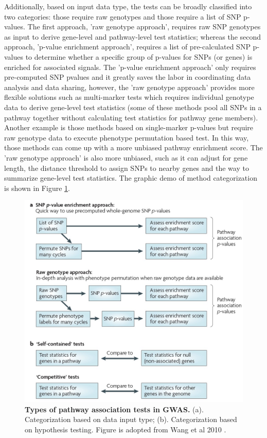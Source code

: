 \documentclass[12pt]{article}
\begin{document}
Additionally, based on input data type, the tests can be broadly classified into two categories: those require raw genotypes and those require a list of SNP p-values. The first approach, 'raw genotype approach', requires raw SNP genotypes as input to derive gene-level and pathway-level test statistics; whereas the second approach, 'p-value enrichment approach', requires a list of pre-calculated SNP p-values to determine whether a specific group of p-values for SNPs (or genes) is enriched for associated signals. The 'p-value enrichment approach' only requires pre-computed SNP pvalues and it greatly saves the labor in coordinating data analysis and data sharing, however, the 'raw genotype approach' provides more flexible solutions such as multi-marker tests which requires individual genotype data to derive gene-level test statistics (some of these methods pool all SNPs in a pathway together without calculating test statistics for pathway gene members). Another example is those methods based on single-marker p-values but require raw genotype data to execute phenotype permutation based test. In this way, those methods can come up with a more unbiased pathway enrichment score. The 'raw genotype approach' is also more unbiased, such as it can adjust for gene length, the distance threshold to assign SNPs to nearby genes and the way to summarize gene-level test statistics. The graphic demo of method categorization is shown in Figure \ref{fig: pathwayTests}.

\begin{figure}[H]
\centering
\includegraphics[scale=0.5]{pathwayTests_definition}

\caption{ \textbf{Types of pathway association tests in GWAS.} (a). Categorization based on data input type; (b). Categorization based on hypothesis testing. Figure is adopted from Wang et al 2010 \cite{Wang2010}. \label{fig: pathwayTests}}
\end{figure}
\end{document}
